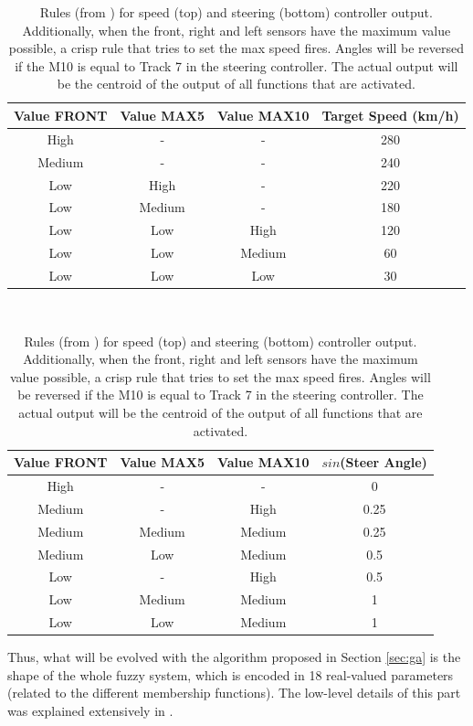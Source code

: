 \documentclass[10pt,journal,compsoc]{IEEEtran}
\begin{document}
\begin{table}[h!tb]
  \centering
  {\scriptsize
    \caption{Rules  (from \cite{salem_evo18}) for speed (top) and steering
      (bottom) controller output. Additionally, when 
      the front, right and left sensors have the maximum value
      possible, a crisp rule that tries to set the max speed
      fires.  Angles will be reversed
      if the M10 is equal to Track 7 in the steering controller. The
      actual output will be the centroid of the output of all functions
      that are activated. \label{tab:output}}
    \begin{tabular}{|c|c|c||c|}
\hline
      Value FRONT & Value MAX5 & Value MAX10 & Target Speed (km/h) \\
      \hline
      High & - & - & 280 \\
      Medium & - & - & 240 \\
      Low & High & - & 220 \\
      Low & Medium & - & 180 \\
      Low & Low & High & 120 \\
      Low & Low & Medium & 60 \\           
      Low & Low & Low & 30 \\     
\hline
\end{tabular}
\vspace{1em} \\
\begin{tabular}{|c|c|c||c|}
\hline
      Value FRONT & Value MAX5 & Value MAX10 & $sin$(Steer Angle) \\
\hline
      High & - & - & 0 \\
      Medium & - & High & 0.25 \\
      Medium & Medium & Medium & 0.25 \\
      Medium & Low & Medium & 0.5 \\
      Low & - & High & 0.5 \\
      Low & Medium & Medium & 1 \\
      Low & Low & Medium & 1 \\ 
      
\hline
\end{tabular}
}
\end{table}



Thus, what will be evolved with the algorithm proposed in Section
\ref{sec:ga} is the shape of the whole fuzzy system, which is encoded
in 18 real-valued parameters (related to the different membership
functions). The low-level details of this part was explained
extensively in \cite{DBLP:conf/cig/SalemMG19}. 
\end{document}
